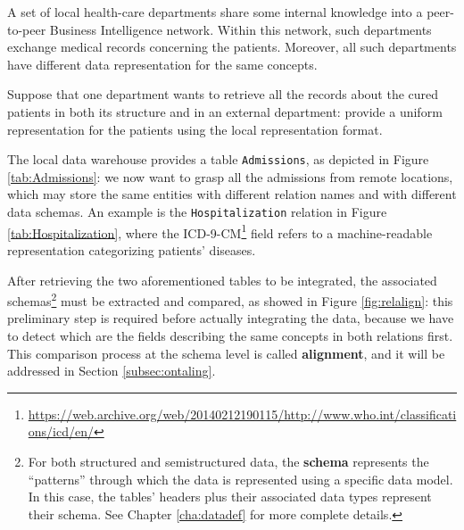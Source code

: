 \begin{example}[label=ex:firstThesis]
A  set of local health-care departments share some internal knowledge into a peer-to-peer Business Intelligence network. Within this network, such departments exchange medical records concerning the patients. Moreover, all such departments have different data representation for the same concepts.

Suppose that one department wants to retrieve all the records about the cured patients in both its structure and in an external department: provide a uniform representation for the patients using the local representation format.

The local data warehouse provides a table \texttt{Admissions}, as depicted in Figure \ref{tab:Admissions}: we now want to grasp all the admissions from remote locations, which may store the same entities with different relation names and with different data schemas. An example is the \texttt{Hospitalization} relation in Figure \ref{tab:Hospitalization}, where the ICD-9-CM\footnote{\url{https://web.archive.org/web/20140212190115/http://www.who.int/classifications/icd/en/}} field refers to a machine-readable representation categorizing patients' diseases.
\end{example}



After retrieving the two aforementioned tables to be integrated, the associated schemas\footnote{For both structured and semistructured data, the \textbf{schema} represents the ``patterns'' through which the data is represented using a specific data model. In this case, the tables' headers plus their associated data types represent their schema. See Chapter \ref{cha:datadef} for more complete details.} must be extracted and compared, as showed in Figure  \ref{fig:relalign}: this preliminary step is required before actually integrating the data, because we have to detect which are the fields describing the same concepts in both relations first. This comparison process at the schema level is called \textbf{alignment}, and it will be addressed in Section \vref{subsec:ontaling}.


